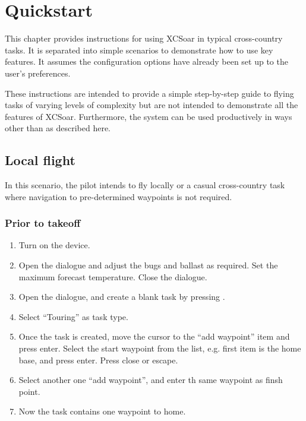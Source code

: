 \chapter{Quickstart}\label{cha:quickstart}

This chapter provides instructions for using XCSoar in typical
cross-country tasks.  It is separated into simple scenarios to
demonstrate how to use key features.  It assumes the configuration
options have already been set up to the user's preferences.

These instructions are intended to provide a simple step-by-step guide
to flying tasks of varying levels of complexity but are not intended
to demonstrate all the features of XCSoar.  Furthermore, the system
can be used productively in ways other than as described here.

\section{Local flight}\label{sec:local-flight}

In this scenario, the pilot intends to fly locally or a casual
cross-country task where navigation to pre-determined waypoints is not
required.

\subsection*{Prior to takeoff}
\begin{enumerate}
\item  Turn on the device.
\item  Open the  dialogue and adjust the bugs and ballast as
  required. Set the maximum forecast temperature.  Close the dialogue.
\item  Open the  dialogue, and create a blank task by pressing
.
\item  Select ``Touring'' as  task type.
\item  Once the task is created, move the cursor to the ``add waypoint'' item
  and press enter.  Select the start waypoint from the list, e.g. first item is
  the home base, and press enter.
  Press close or escape.
\item Select another one ``add waypoint'', and enter th same waypoint as finsh
  point.
\item  Now the task contains one waypoint to home.
\end{enumerate}

